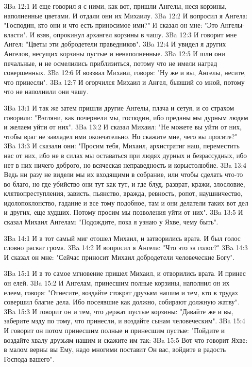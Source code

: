 \vs 3Ba 12:1
И еще говорил я с ними, как вот, пришли Ангелы, неся корзины, наполненные цветами. И отдали они их Михаилу.
\vs 3Ba 12:2
И вопросил я Ангела: "Господин, кто они и что есть приносимое ими?" И сказал он мне: "Это Ангелы-власти". И взяв, опрокинул архангел корзины в чашу.
\vs 3Ba 12:3
И говорит мне Ангел: "Цветы эти добродетели праведников".
\vs 3Ba 12:4
И увидел я других Ангелов, несущих корзины пустые и ненаполненные.
\vs 3Ba 12:5
И шли они печальные, и не осмелились приблизиться, потому что не имели наград совершенных.
\vs 3Ba 12:6
И воззвал Михаил, говоря: "Ну же и вы, Ангелы, несите, что принесли".
\vs 3Ba 12:7
И огорчился Михаил и Ангел, бывший со мной, потому что не наполнили они чашу.

\vs 3Ba 13:1
И так же затем пришли другие Ангелы, плача и сетуя, и со страхом говорили: "Взгляни, как почернели мы, господин, ибо преданы мы дурным людям и желаем уйти от них".
\vs 3Ba 13:2
И сказал Михаил: "Не можете вы уйти от них, чтобы враг не завладел ими окончательно. Но скажите мне, чего вы просите?"
\vs 3Ba 13:3
И сказали они: "Просим тебя, Михаил, архистратиг наш, переместить нас от них, ибо не в силах мы оставаться при людях дурных и безрассудных, ибо нет в них ничего доброго, но всяческая неправедность и корыстолюбие.
\vs 3Ba 13:4
Ведь ни разу не видели мы их входящими в собрание, или чтобы сделать что-то во благо, но где убийство они тут как тут, и где блуд, разврат, кражи, злословие, клятвопреступления, зависть, пьянство, вражда, ревность, ропот, наушничество, идолопоклонство, гадание и все тому подобное, там и они делатели таких вот дел и других, еще худших. Потому просим мы позволения уйти от них".
\vs 3Ba 13:5
И сказал Михаил Ангелам: "Подождите, пока я узнаю у Яхве, чему быть".

\vs 3Ba 14:1
И в тот самый миг отошел Михаил, и затворились врата. И был голос словно раскат грома.
\vs 3Ba 14:2
И вопросил я Ангела: "Что это за голос?"
\vs 3Ba 14:3
И сказал он мне: "Сейчас приносит Михаил добродетели человеческие Богу".

\vs 3Ba 15:1
И в то самое мгновение пришел Михаил, и отворились врата. И принес он елей.
\vs 3Ba 15:2
И Ангелам, принесшим полные корзины, наполнил он их елеем, говоря: "Отнесите, воздайте стократ друзьям нашим и тем, кто в трудах совершил благие дела. Ибо посеявшие как должно, собирают должную жатву".
\vs 3Ba 15:3
И говорит он и тем, что держат пустые корзины: "Давайте же и вы, заберите мзду по тому, что принесли, и воздайте сынам человеческим".
\vs 3Ba 15:4
И говорит он потом принесшим полные и принесшим пустые: "Пойдите и воздайте хвалу друзьям нашим и скажите им так:
\vs 3Ba 15:5
Вот что говорит Яхве: в малом верны вы Ему, надо многими поставит Он вас, войдите в радость Господа вашего".

